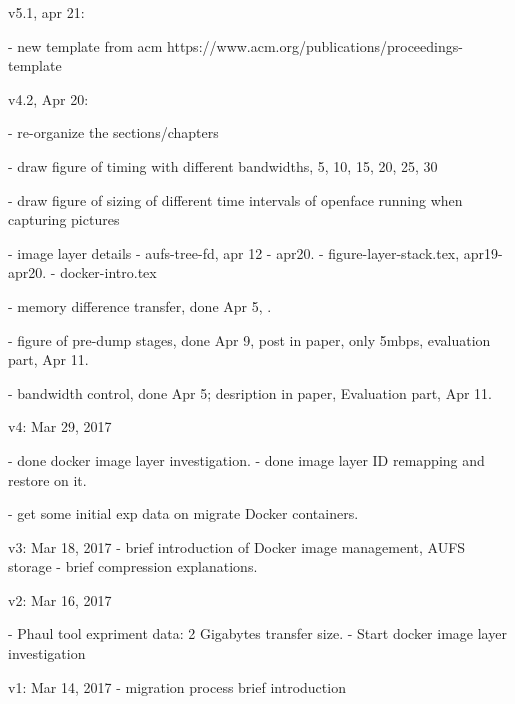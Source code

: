 v5.1, apr 21:

 - new template from acm
    https://www.acm.org/publications/proceedings-template
 
v4.2, Apr 20: 

 - re-organize the sections/chapters
 
 - draw figure of timing with different bandwidths, 5, 10, 15, 20, 25, 30
 
 - draw figure of sizing of different time intervals of openface running when capturing pictures
 
 - image layer details
    - aufs-tree-fd, apr 12 - apr20.
    - figure-layer-stack.tex, apr19-apr20.
    - docker-intro.tex
 
 - memory difference transfer, done Apr 5, .
 
 - figure of pre-dump stages, done Apr 9, post in paper, only 5mbps, evaluation part, Apr 11.
 
 - bandwidth control, done Apr 5; desription in paper, Evaluation part, Apr 11.

v4: Mar 29, 2017
    
    - done docker image layer investigation.
    - done image layer ID remapping and restore on it.
    
    - get some initial exp data on migrate Docker containers.
    

v3: Mar 18, 2017
    - brief introduction of Docker image management, AUFS storage
    - brief compression explanations.
    
v2: Mar 16, 2017

    - Phaul tool expriment data: 2 Gigabytes transfer size. 
    - Start docker image layer investigation

v1: Mar 14, 2017
    - migration process brief introduction


\fi

